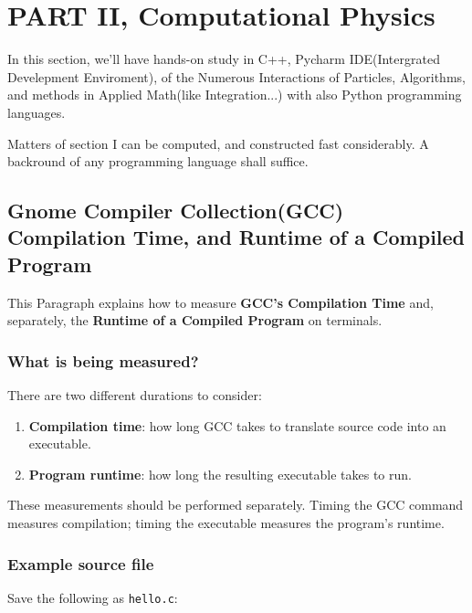 \documentclass[a4paper, 10pt, onepage]{elegantbook}
\begin{document}
{\chapter{PART II, Computational Physics}

In this section, we'll have hands-on study in C++,  Pycharm IDE(Intergrated Develepment Enviroment), 
of the Numerous Interactions of Particles, Algorithms, and methods in Applied Math(like Integration...)  with also 
Python programming languages. 

Matters of section I can be computed, and constructed fast considerably. A backround of any programming language shall 
suffice.

\section{Gnome Compiler Collection(GCC) Compilation Time, and Runtime of a Compiled Program}

\noindent

This Paragraph explains how to measure \textbf{GCC’s Compilation Time} and, separately, the \textbf{Runtime of a 
Compiled Program} on terminals.


\lstset{
  basicstyle=\ttfamily\small,
  breaklines=true,
  frame=single,
  columns=fullflexible,
  keepspaces=true
}

\subsection{What is being measured?}

There are two different durations to consider:

\begin{enumerate}
  \item \textbf{Compilation time}: how long GCC takes to translate source
        code into an executable.
  \item \textbf{Program runtime}: how long the resulting executable takes
        to run.
\end{enumerate}

These measurements should be performed separately. Timing the GCC command
measures compilation; timing the executable measures the program's runtime.

\subsection{Example source file}

Save the following as \texttt{hello.c}:

}
\end{document}
